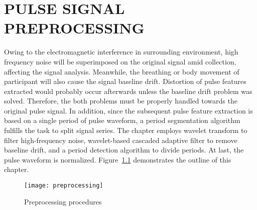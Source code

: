 \chapter[Pulse signal preprocessing]{\uppercase{Pulse signal preprocessing}}
\label{chap:three}

Owing to the electromagnetic interference in surrounding environment,
high frequency noise will be superimposed on the original signal
amid collection, affecting the signal analysis. 
Meanwhile, the breathing or body movement of participant will also
cause the signal baseline drift. Distortion of pulse features
extracted would probably occur afterwards unless the baseline drift problem
was solved. Therefore, the both problems must be properly handled
towards the original pulse signal. In addition, since the subsequent
pulse feature extraction is based on a single period of pulse
waveform, a period segmentation algorithm fulfills the task to split
signal series. The chapter employs wavelet transform to filter
high-frequency noise, wavelet-based cascaded adaptive filter to remove
baseline drift, and a period detection algorithm to divide periods.
At last, the pulse waveform is normalized.
Figure~\ref{fig:preprocessing} demonstrates the outline of this
chapter.
\begin{figure}[htpb]
    \begin{center}
        \texttt{[image: preprocessing]}
    \end{center}
    \caption{Preprocessing procedures}
    \label{fig:preprocessing}
\end{figure}




